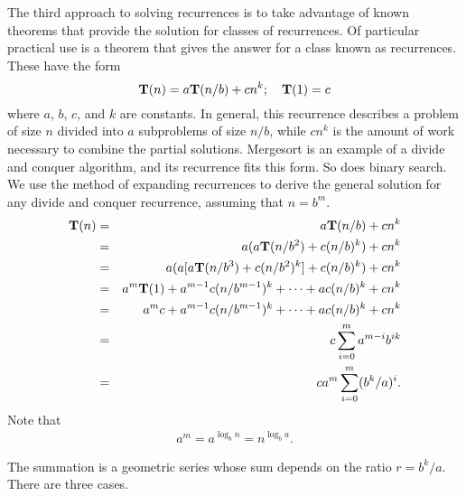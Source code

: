 The third approach to solving recurrences is to take advantage of
known theorems that provide the solution for classes of recurrences.
Of particular practical use is a theorem that gives the
answer for a class known as  recurrences.
These have the form
\[{\bf T}(n) = a{\bf T}(n/b) + cn^k; \quad {\bf T}(1) = c\]
\noindent where \(a\), \(b\), \(c\), and \(k\) are constants.
In general, this recurrence describes a problem of size \(n\) divided
into \(a\) subproblems of size \(n/b\), while \(cn^k\) is the amount of work
necessary to combine the partial solutions.
Mergesort is an example of a divide and conquer algorithm, and its
recurrence fits this form.
So does binary search.
We use the method of expanding recurrences to derive the general
solution for any divide and conquer recurrence, assuming that \(n = b^m\).
\begin{eqnarray*}
{\bf T}(n) & = & a{\bf T}(n/b) + cn^k\\
     & = & a(a{\bf T}(n/b^2) + c(n/b)^k) + cn^k\\
     & = & a(a[a{\bf T}(n/b^3) + c(n/b^2)^k] + c(n/b)^k) + cn^k\\
     & = & a^m{\bf T}(1) + a^{m-1}c(n/b^{m-1})^k + \cdots + ac(n/b)^k + cn^k\\
     & = & a^mc + a^{m-1}c(n/b^{m-1})^k + \cdots + ac(n/b)^k + cn^k\\
     & = & c\sum_{i=0}^{m} a^{m-i} b^{ik}\\
     & = &ca^m\sum_{i=0}^{m} (b^k/a)^i.\index{summation}
\end{eqnarray*}
\noindent Note that
\begin{eqnarray}
\label{ThmEquiv}
a^m = a^{\log_bn} = n^{\log_ba}.
\end{eqnarray}

The summation is a geometric series whose sum depends on the ratio
\(r = b^k/a\).
\noindent There are three cases.

